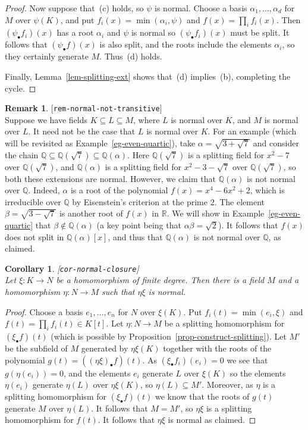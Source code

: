 \documentclass{amsart}
\newcommand{\lbl}[1]{\label{#1}\textup{[\texttt{#1}]}\ \\}
\newcommand{\lbl}{\label}
\newcommand{\Q}         {{\mathbb{Q}}}
\newcommand{\R}         {{\mathbb{R}}}
\newcommand{\al}        {\alpha}
\newcommand{\bt}        {\beta}
\newcommand{\sse}       {\subseteq}
\renewcommand{\:}{\colon}
\newtheorem{corollary}[theorem]{Corollary}
\theoremstyle{definition}
\newtheorem{remark}[theorem]{Remark}
\begin{document}
\begin{proof}
 Now suppose that~(c) holds, so $\psi$ is normal.  Choose a basis
 $\al_1,\dotsc,\al_d$ for $M$ over $\psi(K)$, and put
 $f_i(x)=\min(\al_i,\psi)$ and $f(x)=\prod_if_i(x)$.  Then
 $(\psi_\bullet f_i)(x)$ has a root $\al_i$ and $\psi$ is normal so
 $(\psi_\bullet f_i)(x)$ must be split.  It follows that
 $(\psi_\bullet f)(x)$ is also split, and the roots include the
 elements $\al_i$, so they certainly generate $M$.  Thus~(d) holds. 

 Finally, Lemma~\ref{lem-splitting-ext} shows that~(d) implies~(b),
 completing the cycle.
\end{proof}

\begin{remark}\lbl{rem-normal-not-transitive}
 Suppose we have fields $K\sse L\sse M$, where $L$ is normal over $K$,
 and $M$ is normal over $L$.  It need not be the case that $L$ is
 normal over $K$.  For an example (which will be revisited as
 Example~\ref{eg-even-quartic}), take $\al=\sqrt{3+\sqrt{7}}$ and
 consider the chain $\Q\sse\Q(\sqrt{7})\sse\Q(\al)$.  Here
 $\Q(\sqrt{7})$ is a splitting field for $x^2-7$ over $\Q(\sqrt{7})$,
 and $\Q(\al)$ is a splitting field for $x^2-3-\sqrt{7}$ over
 $\Q(\sqrt{7})$, so both these extensions are normal.  However, we
 claim that $\Q(\al)$ is not normal over $\Q$.  Indeed, $\al$ is a
 root of the polynomial $f(x)=x^4-6x^2+2$, which is irreducible over
 $\Q$ by Eisenstein's criterion at the prime $2$.  The element
 $\bt=\sqrt{3-\sqrt{7}}$ is another root of $f(x)$ in $\R$.  We will
 show in Example~\ref{eg-even-quartic} that $\bt\not\in\Q(\al)$ (a key
 point being that $\al\bt=\sqrt{2}$).  It follows that $f(x)$ does not
 split in $\Q(\al)[x]$, and thus that $\Q(\al)$ is not normal over
 $\Q$, as claimed.
\end{remark}

\begin{corollary}\lbl{cor-normal-closure}
 Let $\xi\:K\to N$ be a homomorphism of finite degree.  Then there is
 a field $M$ and a homomorphism $\eta\:N\to M$ such that $\eta\xi$ is
 normal.  
\end{corollary}
\begin{proof}
 Choose a basis $e_1,\dotsc,e_n$ for $N$ over $\xi(K)$.  Put
 $f_i(t)=\min(e_i,\xi)$ and $f(t)=\prod_if_i(t)\in K[t]$.  Let
 $\eta\:N\to M$ be a splitting homomorphism for $(\xi_\bullet f)(t)$
 (which is possible by Proposition~\ref{prop-construct-splitting}).
 Let $M'$ be the subfield of $M$ generated by $\eta\xi(K)$ together
 with the roots of the polynomial $g(t)=((\eta\xi)_\bullet f)(t)$.  As
 $(\xi_\bullet f_i)(e_i)=0$ we see that $g(\eta(e_i))=0$, and the
 elements $e_i$ generate $L$ over $\xi(K)$ so the elements $\eta(e_i)$
 generate $\eta(L)$ over $\eta\xi(K)$, so $\eta(L)\sse M'$.  Moreover,
 as $\eta$ is a splitting homomorphism for $(\xi_\bullet f)(t)$ we
 know that the roots of $g(t)$ generate $M$ over $\eta(L)$.  It
 follows that $M=M'$, so $\eta\xi$ is a splitting homomorphism for
 $f(t)$.  It follows that $\eta\xi$ is normal as claimed.
\end{proof}
\end{document}
